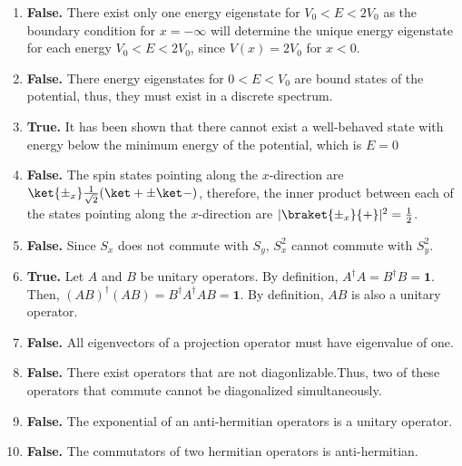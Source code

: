 \begin{sol}
\begin{enumerate}
    \item
    \textbf{False.} There exist only one energy eigenstate for $V_0<E<2V_0$ as the boundary condition for $x=-\infty$ will determine the unique energy eigenstate for each energy $V_0<E<2V_0$, since $V(x)=2V_0$ for $x<0$.
    \item
    \textbf{False.} There energy eigenstates for $0<E<V_0$ are bound states of the potential, thus, they must exist in a discrete spectrum.
    \item
    \textbf{True.} It has been shown that there cannot exist a well-behaved state with energy below the minimum energy of the potential, which is $E=0$
    \item
    \textbf{False.} The spin states pointing along the $x$-direction are $\ket{\pm_x}\frac{1}{\sqrt{2}}(\ket+\pm\ket-)$, therefore, the inner product between each of the states pointing along the $x$-direction are $|\braket{\pm_x}{+}|^2=\frac{1}{2}$.
    \item
    \textbf{False.} Since $S_x$ does not commute with $S_y$, $S_x^2$ cannot commute with $S_y^2$. 
    \item
    \textbf{True.} Let $A$ and $B$ be unitary operators. By definition, $A^\dagger A=B^\dagger B=\mathbf{1}$. Then, $(AB)^\dagger(AB)=B^\dagger A^\dagger AB=\mathbf{1}$. By definition, $AB$ is also a unitary operator.
    \item
    \textbf{False.} All eigenvectors of a projection operator must have eigenvalue of one.
    \item
    \textbf{False.} There exist operators that are not diagonlizable.Thus, two of these operators that commute cannot be diagonalized simultaneously.
    \item
    \textbf{False.} The exponential of an anti-hermitian operators is a unitary operator.
    \item
    \textbf{False.} The commutators of two hermitian operators is anti-hermitian.

\end{enumerate}
\end{sol}